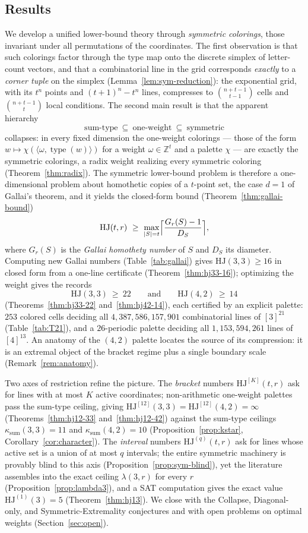 \documentclass[12pt]{article}
\newcommand{\HJ}{\mathrm{HJ}}
\newcommand{\Z}{\mathbb{Z}}
\newcommand{\ksum}{\kappa_{\mathrm{sum}}}
\DeclareMathOperator{\type}{type}
\begin{document}
\subsection*{Results}
We develop a unified lower-bound theory through \emph{symmetric
colorings}, those invariant under all permutations of the coordinates.
The first observation is that such colorings factor through the type map
onto the discrete simplex of letter-count vectors, and that a
combinatorial line in the grid corresponds \emph{exactly} to a
\emph{corner tuple} on the simplex (Lemma~\ref{lem:sym-reduction}): the
exponential grid, with its $t^{n}$ points and $(t+1)^{n}-t^{n}$ lines,
compresses to $\binom{n+t-1}{t-1}$ cells and $\binom{n+t-1}{t}$ local
conditions. The second main result is that the apparent hierarchy
\[
\text{sum-type}\ \subseteq\ \text{one-weight}\ \subseteq\ \text{symmetric}
\]
collapses: in every fixed dimension the one-weight colorings --- those of
the form $w\mapsto\chi(\langle\omega,\type(w)\rangle)$ for a weight
$\omega\in\Z^{t}$ and a palette $\chi$ --- are exactly the symmetric
colorings, a radix weight realizing every symmetric coloring
(Theorem~\ref{thm:radix}). The symmetric lower-bound problem is therefore
a one-dimensional problem about homothetic copies of a $t$-point set, the
case $d=1$ of Gallai's theorem, and it yields the closed-form bound
(Theorem~\ref{thm:gallai-bound})
\[
\HJ(t,r)\ \ge\ \max_{|S|=t}\Bigl\lceil\frac{G_{r}(S)-1}{D_{S}}\Bigr\rceil ,
\]
where $G_{r}(S)$ is the \emph{Gallai homothety number} of $S$ and $D_{S}$
its diameter. Computing new Gallai numbers (Table~\ref{tab:gallai}) gives
$\HJ(3,3)\ge 16$ in closed form from a one-line certificate
(Theorem~\ref{thm:hj33-16}); optimizing the weight gives the records
\[
\HJ(3,3)\ \ge\ 22
\qquad\text{and}\qquad
\HJ(4,2)\ \ge\ 14
\]
(Theorems~\ref{thm:hj33-22} and~\ref{thm:hj42-14}), each certified by an
explicit palette: $253$ colored cells deciding all
$4{,}387{,}586{,}157{,}901$ combinatorial lines of $[3]^{21}$
(Table~\ref{tab:T21}), and a $26$-periodic palette deciding all
$1{,}153{,}594{,}261$ lines of $[4]^{13}$. An anatomy of the $(4,2)$
palette locates the source of its compression: it is an extremal object
of the bracket regime plus a single boundary scale
(Remark~\ref{rem:anatomy}).

Two axes of restriction refine the picture. The \emph{bracket} numbers
$\HJ^{[K]}(t,r)$ ask for lines with at most $K$ active coordinates;
non-arithmetic one-weight palettes pass the sum-type ceiling, giving
$\HJ^{[12]}(3,3)=\HJ^{[12]}(4,2)=\infty$
(Theorems~\ref{thm:hj12-33} and~\ref{thm:hj12-42}) against the sum-type
ceilings $\ksum(3,3)=11$ and $\ksum(4,2)=10$
(Proposition~\ref{prop:kstar}, Corollary~\ref{cor:character}). The
\emph{interval} numbers $\HJ^{(q)}(t,r)$ ask for lines whose active set
is a union of at most $q$ intervals; the entire symmetric machinery is
provably blind to this axis (Proposition~\ref{prop:sym-blind}), yet the
literature assembles into the exact ceiling $\lambda(3,r)$ for every $r$
(Proposition~\ref{prop:lambda3}), and a SAT computation gives the exact
value $\HJ^{(1)}(3)=5$ (Theorem~\ref{thm:hj13}). We close with the
Collapse, Diagonal-only, and Symmetric-Extremality conjectures and with
open problems on optimal weights (Section~\ref{sec:open}).
\end{document}
